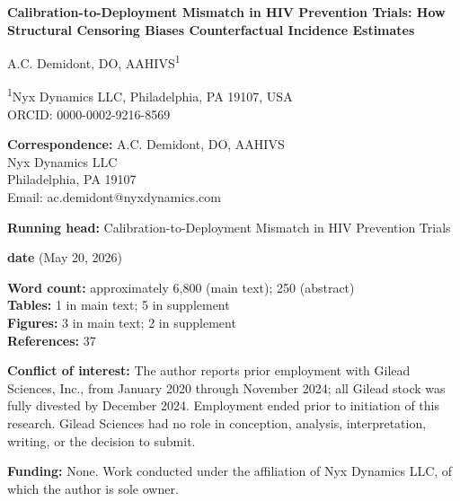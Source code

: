 \documentclass[12pt]{article}
\begin{document}
\thispagestyle{empty}
\begin{center}
\vspace*{0.5in}

{\Large \bfseries Calibration-to-Deployment Mismatch in HIV Prevention Trials: How Structural Censoring Biases Counterfactual Incidence Estimates}

\vspace{0.4in}

A.C. Demidont, DO, AAHIVS\textsuperscript{1}

\vspace{0.2in}

\small
\textsuperscript{1}Nyx Dynamics LLC, Philadelphia, PA 19107, USA \\
ORCID: 0000-0002-9216-8569

\vspace{0.3in}

\textbf{Correspondence:} A.C. Demidont, DO, AAHIVS \\
Nyx Dynamics LLC \\
Philadelphia, PA 19107 \\
Email: ac.demidont@nyxdynamics.com

\vspace{0.3in}

\textbf{Running head:} Calibration-to-Deployment Mismatch in HIV Prevention Trials

\vspace{0.2in}

\textbf{date} (May 20, 2026)

\vspace{0.2in}

\textbf{Word count:} approximately 6,800 (main text); 250 (abstract) \\
\textbf{Tables:} 1 in main text; 5 in supplement \\
\textbf{Figures:} 3 in main text; 2 in supplement \\
\textbf{References:} 37

\vspace{0.3in}

\textbf{Conflict of interest:} The author reports prior employment with Gilead Sciences, Inc., from January 2020 through November 2024; all Gilead stock was fully divested by December 2024. Employment ended prior to initiation of this research. Gilead Sciences had no role in conception, analysis, interpretation, writing, or the decision to submit.

\textbf{Funding:} None. Work conducted under the affiliation of Nyx Dynamics LLC, of which the author is sole owner.

\end{center}
\end{document}
